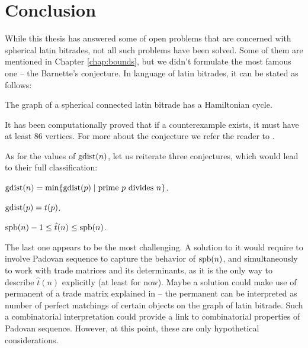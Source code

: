 \chapter*{Conclusion}

While this thesis has answered some of open problems that are concerned with spherical latin bitrades, not all such problems have been solved. Some of them are mentioned in Chapter \ref{chap:bounds}, but we didn't formulate the most famous one -- the Barnette's conjecture. In language of latin bitrades, it can be stated as follows:

\begin{conj*}[Barnette]
The graph of a spherical connected latin bitrade has a Hamiltonian cycle.
\end{conj*}%

\noindent
It has been computationally proved that if a counterexample exists, it must have at least 86 vertices. For more about the conjecture we refer the reader to \cite{Hertel05}.

\bigskip

As for the values of $\mathop{\mathrm{gdist}}(n)$, let us reiterate three conjectures, which would lead to their full classification:

\begin{conj*}
$\mathop{\mathrm{gdist}}(n) = \min \{\mathop{\mathrm{gdist}}(p) \mid \mbox{prime } p \mbox{ divides } n\}$.
\end{conj*}%

\begin{conj*}
$\mathop{\mathrm{gdist}}(p) = t(p)$.
\end{conj*}%

\begin{conj*}
$\mathop{\mathrm{spb}}(n)-1 \leq \hat t(n) \leq \mathop{\mathrm{spb}}(n)$.
\end{conj*}%

The last one appears to be the most challenging. A solution to it would require to involve Padovan sequence to capture the behavior of $\mathop{\mathrm{spb}}(n)$, and simultaneously to work with trade matrices and its determinants, as it is the only way to describe $\hat t(n)$ explicitly (at least for now). Maybe a solution could make use of permanent of a trade matrix explained in \cite{CavenaghWanless09} -- the permanent can be interpreted as number of perfect matchings of certain objects on the graph of latin bitrade. Such a combinatorial interpretation could provide a link to combinatorial properties of Padovan sequence. However, at this point, these are only hypothetical considerations.